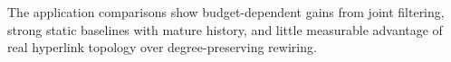 The application comparisons show budget-dependent gains from joint filtering, strong static baselines with mature history, and little measurable advantage of real hyperlink topology over degree-preserving rewiring.
